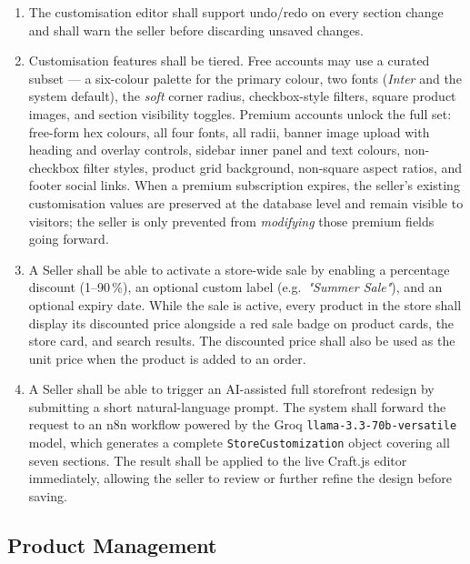 \documentclass[12pt, a4paper, oneside]{report}
\begin{document}
\begin{enumerate}[label=\textbf{FR-S\arabic*.},leftmargin=*,itemsep=2pt]
  \item The customisation editor shall support undo/redo on every
        section change and shall warn the seller before discarding
        unsaved changes.
  \item Customisation features shall be tiered. Free accounts may
        use a curated subset --- a six-colour palette for the primary
        colour, two fonts (\textit{Inter} and the system default),
        the \textit{soft} corner radius, checkbox-style filters,
        square product images, and section visibility toggles.
        Premium accounts unlock the full set: free-form hex colours,
        all four fonts, all radii, banner image upload with heading
        and overlay controls, sidebar inner panel and text colours,
        non-checkbox filter styles, product grid background,
        non-square aspect ratios, and footer social links. When a
        premium subscription expires, the seller's existing
        customisation values are preserved at the database level and
        remain visible to visitors; the seller is only prevented from
        \emph{modifying} those premium fields going forward.
  \item A Seller shall be able to activate a store-wide sale by
        enabling a percentage discount (1--90\,\%), an optional custom
        label (e.g.\ \textit{"Summer Sale"}), and an optional expiry
        date. While the sale is active, every product in the store
        shall display its discounted price alongside a red sale badge
        on product cards, the store card, and search results. The
        discounted price shall also be used as the unit price when the
        product is added to an order.
  \item A Seller shall be able to trigger an AI-assisted full
        storefront redesign by submitting a short natural-language
        prompt. The system shall forward the request to an n8n
        workflow powered by the Groq \texttt{llama-3.3-70b-versatile}
        model, which generates a complete \texttt{StoreCustomization}
        object covering all seven sections. The result shall be applied
        to the live Craft.js editor immediately, allowing the seller
        to review or further refine the design before saving.
\end{enumerate}

\subsection{Product Management}
\end{document}
